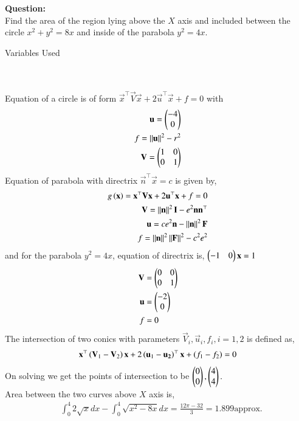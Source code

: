 \documentclass[journal]{IEEEtran}
\begin{document}
\textbf{Question:}\\
Find the area of the region lying above the $X$ axis and included between the circle $x^2+y^2=8x$ and inside of the parabola $y^2=4x$. \hfill {}
\begin{table}[h!] 
  \centering
  
  \caption{Variables Used}
  \label{tab9-5.6-1}
\end{table}\\
\solution\\
Equation of a circle is of form $\vec{x}^{\top}\vec{V}\vec{x}+2\vec{u}^{\top}\vec{x}+f=0$ with
\begin{align}
	\mathbf{u}=\begin{pmatrix}-4\\0\end{pmatrix}\\
	f=\left\lVert\mathbf{u}\right\rVert^2-r^2\\
	\mathbf{V}=\begin{pmatrix}1&0\\0&1\end{pmatrix}
\end{align}
Equation of parabola with directrix $\vec{n}^{\top}\vec{x}=c$ is given by,
\begin{align}
	g\left(\mathbf{x}\right)=\mathbf{x}^{\top}\mathbf{V}\mathbf{x}+2\mathbf{u}^{\top}\mathbf{x}+f=0\\
	\mathbf{V}=\left\lVert\mathbf{n}\right\rVert^2\mathbf{I}-e^2\mathbf{n}\mathbf{n}^{\top}\\
	\mathbf{u}=ce^2\mathbf{n}-\left\lVert\mathbf{n}\right\rVert^2\mathbf{F}\\
	f=\left\lVert\mathbf{n}\right\rVert^2\left\lVert\mathbf{F}\right\rVert^2-c^2e^2
\end{align}
and for the parabola $y^2=4x$, equation of directrix is, $\begin{pmatrix}-1&0\end{pmatrix}\mathbf{x}=1$
\begin{align}
	\mathbf{V}&=\begin{pmatrix}0&0\\0&1\end{pmatrix}\\
	\mathbf{u}&=\begin{pmatrix}-2\\0\end{pmatrix}\\
	f&=0
\end{align}
The intersection of two conics with parameters $\vec{V}_i,\vec{u}_i,f_i, i=1,2$ is defined as,
\begin{align}
	\mathbf{x}^{\top}\left(\mathbf{V}_1-\mathbf{V}_2\right)\mathbf{x}+2\left(\mathbf{u}_1-\mathbf{u_2}\right)^{\top}\mathbf{x}+\left(f_1-f_2\right)=0
\end{align} 
On solving we get the points of intersection to be $\begin{pmatrix}0\\0\end{pmatrix},\begin{pmatrix}4\\4\end{pmatrix}.$\\
Area between the two curves above $X$ axis is,
\begin{align}
	&\int_0^4 2\sqrt{x} dx- \int_0^4 \sqrt{x^2-8x} dx = \frac{12\pi-32}{3} = 1.899 \text{approx}.
\end{align}
\end{document}

